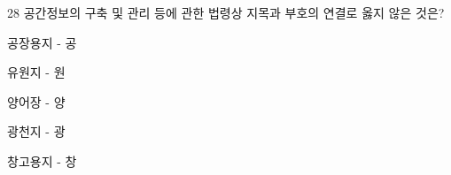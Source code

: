 \begin{question}{28}
공간정보의 구축 및 관리 등에 관한 법령상 지목과 부호의 연결로 옳지 않은 것은?
\begin{choices}
  \item 공장용지 - 공
  \item 유원지 - 원
  \item 양어장 - 양
  \item 광천지 - 광
  \item 창고용지 - 창
\end{choices}
\end{question}
